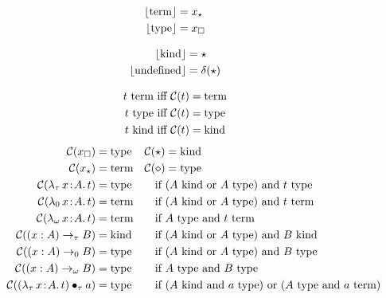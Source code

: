 
\begin{figure}
    \centering
    \begin{minipage}{0.5\textwidth}
        \begin{align*}
            \lfloor \!\!~\textnormal{term} \rfloor &= x_\star \\
            \lfloor \!\!~\textnormal{type} \rfloor &= x_\square
        \end{align*}
    \end{minipage}%
    \begin{minipage}{0.5\textwidth}
        \begin{align*}
            \lfloor \!\!~\textnormal{kind} \rfloor &= \star \\
            \lfloor \text{undefined} \rfloor &= \delta(\star)
        \end{align*}
    \end{minipage}
    \begin{align*}
        t~\textnormal{term} &\text{ iff } \mathcal{C}(t) =\!\!~\textnormal{term} \\
        t~\textnormal{type} &\text{ iff } \mathcal{C}(t) =\!\!~\textnormal{type} \\
        t~\textnormal{kind} &\text{ iff } \mathcal{C}(t) =\!\!~\textnormal{kind}
    \end{align*}
    \begin{align*}
        \mathcal{C}(x_\square) &=\!\! \ptype &\mathcal{C}(\star) &=\!\! \pkind\\
        \mathcal{C}(x_\star) &=\!\! \pterm &\mathcal{C}(\diamond) &=\!\! \ptype\\
        \mathcal{C}(\abs{\lambda_\tau}{x}{A}{t}) &=\!\! \ptype &\text{if }& (A\pkind \text{ or } A\ptype) \text{ and } t\ptype \\
        \mathcal{C}(\abs{\lambda_0}{x}{A}{t}) &=\!\! \pterm &\text{if }& (A\pkind \text{ or } A\ptype) \text{ and } t\pterm \\
        \mathcal{C}(\abs{\lambda_\omega}{x}{A}{t}) &=\!\! \pterm &\text{if }& A\ptype \text{ and } t\pterm \\
        \mathcal{C}((x : A) \to_\tau B) &=\!\! \pkind &\text{if }& (A\pkind \text{ or } A\ptype) \text{ and } B\pkind \\
        \mathcal{C}((x : A) \to_0 B) &=\!\! \ptype &\text{if }& (A\pkind \text{ or } A\ptype) \text{ and } B\ptype \\
        \mathcal{C}((x : A) \to_\omega B) &=\!\! \ptype &\text{if }& A\ptype \text{ and } B\ptype \\
        \mathcal{C}(\app{(\abs{\lambda_\tau}{x}{A}{t})}{\tau}{a}) &=\!\! \ptype &\text{if }& (A\pkind \text{ and } a\ptype) \text{ or } (A\ptype \text{ and } a\pterm) \\

\end{align*}
\end{figure}
